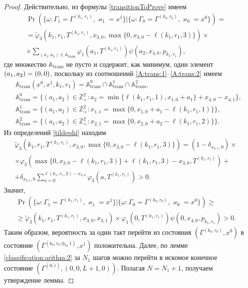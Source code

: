 \begin{proof}
Действительно,  из формулы \eqref{transitionToProve} имеем
\begin{multline*}
\Pr (\{\omega\colon \Gamma_{1}=\Gamma^{(k_1,  r_1)}, \varkappa_{1}=x^1 \}| \{\omega\colon \Gamma_{0}=\Gamma^{(k_0,  r_0)}, \varkappa_0=x^0\})=\\
=\widetilde{\varphi}_3(k_1,  r_1,  T^{(k_1,  r_1)},  x_{3,  0}, \max{\{0,  x_{3,  0} - \ell(k_1,  r_1,  3)\}})\times \\
\times
\sum_{(a_1,  a_2)\in {\mathbb A}_{\mathrm{trans}}}\varphi_1(a_1,  T^{(k_1,  r_1)})  \psi(a_2,  x_{4,  0},  p_{k_1,  r_1}), 
\end{multline*}
где множество ${\mathbb A}_{\mathrm{trans}}$ не пусто и содержит,  как минимум,  один элемент $(a_1,  a_2)\hm=(0,  0)$,  поскольку из соотношений \eqref{A:trans:1}--\eqref{A:trans:2} имеем
\begin{align*}
&{\mathbb A}_{\mathrm{trans}}(x^0,  x^1,  k_1,  r_1) = {\mathbb A}_{\mathrm{trans}}^0 \cap {\mathbb A}_{\mathrm{trans}}^1\cap {\mathbb A}_{\mathrm{trans}}^2, \\
&{\mathbb A}_{\mathrm{trans}}^0 = \{(a_1,  a_2) \in \mathbb{Z}_+^2 \colon a_2 = \min{\{\ell(k_1,  r_1,  1),  x_{1,  0}+a_1}\} +x_{4,  0}- x_{4,  1}\}, \\
&{\mathbb A}_{\mathrm{trans}}^1 = \{(a_1,  a_2) \in \mathbb{Z}_+^2 \colon x_{1,  1}=\max{\{0,  x_{1,  0}+a_1-\ell(k_1,  r_1,  1)\}}\}, \\
& {\mathbb A}_{\mathrm{trans}}^2 = \{(a_1,  a_2) \in \mathbb{Z}_+^2 \colon  x_{2,  1} =\max{\{0,  x_{2,  0}+a_2-\ell(k_1,  r_1,  2)\}}\}.
\end{align*}
Из определений \eqref{tildephi} находим
\begin{multline*}
\widetilde{\varphi}_3(k_1,  r_1,  T^{(k_1,  r_1)}, x_{3,  0}, \max{\{0,  x_{3,  0} - \ell(k_1,  r_1,  3)\}}) = (1-\delta_{x_{3,  1},  0}) \times \\\times\varphi_3(\max{\{0,  x_{3,  0} - \ell(k_1,  r_1,  3)\}} + \ell (k_1,  r_1,  3) - x_{3,  0},  T^{(k_1,  r_1)} ) 
+\\+\delta_{x_{3,  1},  0} \sum_{a=0}^{\ell(k_1,  r_1,  3)-x_{3,  0}}\varphi_3 (a,  T^{(k_1,  r_1)})>0.
\end{multline*}
Значит, 
\begin{multline*}
\Pr (\{\omega\colon \Gamma_{1}=\Gamma^{(k_1,  r_1)}, \varkappa_{1}=x^1\}|\{\omega\colon  \Gamma_{0}=\Gamma^{(k_0,  r_0)}, \varkappa_0=x^0\})\geqslant \\
\geqslant \widetilde{\varphi}_3(k_1,  r_1,  T^{(k_1,  r_1)},  x_{3,  0},  x_{3,  1})
\times
\varphi_1(0,  T^{(k_1,  r_1)})  \psi(0,  x_{4,  0},  p_{k_1,  r_1}) > 0.
\end{multline*}
Таким образом, вероятность за один такт перейти из состояния $(\Gamma^{(k_0,  r_0)},  x^0)$ в состояние $ (\Gamma^{(k_0,  r_0\oplus_{k_0}1)},  x^1)$ положительна.
Далее,  по лемме \eqref{classification:arithm:2} за $N_1$ шагов можно перейти в искомое конечное состояние $(\Gamma^{(0, \tilde{r} )},  (0,  0,  L+1,  0))$. Полагая $N=N_1+1$,  получаем утверждение леммы.
\end{proof}

